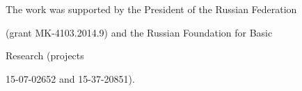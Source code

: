 \vspace*{-18pt}





\Ack


    \noindent


The work was supported by the President of the Russian Federation


(grant MK-4103.2014.9) and the Russian Foundation for Basic


Research (projects


15-07-02652 and 15-37-20851).

















